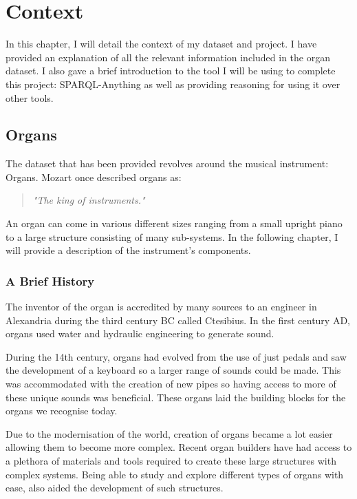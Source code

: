 \chapter{Context}
In this chapter, I will detail the context of my dataset and project. I have provided an explanation of all the relevant information included in the organ dataset. I also gave a brief introduction to the tool I will be using to complete this project: SPARQL-Anything as well as providing reasoning for using it over other tools. 

\section{Organs}
\hspace{0.5cm} The dataset that has been provided revolves around the musical instrument: Organs. Mozart once described organs as:

\begin{quote}
    \textit{"The king of instruments."}
\end{quote}

An organ can come in various different sizes ranging from a small upright piano to a large structure consisting of many sub-systems. In the following chapter, I will provide a description of the instrument's components.

\subsection{A Brief History}
\hspace{0.5cm} 
The inventor of the organ is accredited by many sources to an engineer in Alexandria during the third century BC called Ctesibius. In the first century AD, organs used water and hydraulic engineering to generate sound. \cite{organhistory}

During the 14th century, organs had evolved from the use of just pedals and saw the development of a keyboard so a larger range of sounds could be made. This was accommodated with the creation of new pipes so having access to more of these unique sounds was beneficial. These organs laid the building blocks for the organs we recognise today. \cite{organmedivalhistory}

Due to the modernisation of the world, creation of organs became a lot easier allowing them to become more complex. Recent organ builders have had access to a plethora of materials and tools required to create these large structures with complex systems. Being able to study and explore different types of organs with ease, also aided the development of such structures.  \cite{organhistory1}

